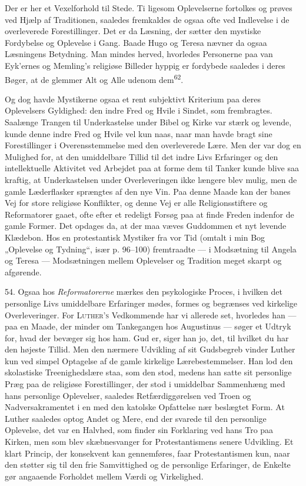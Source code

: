 \documentclass[12pt,a4paper,openany]{book}
\newcommand{\opage}[1]{\marginnote{\footnotesize\textit{[#1]}}}
\begin{document}
Der er her et Vexelforhold til Stede. Ti ligesom Oplevelserne fortolkes
og prøves ved Hjælp af Traditionen, saaledes fremkaldes de ogsaa ofte
ved Indlevelse i de overleverede Forestillinger. Det er da Læsning, der
sætter den mystiske Fordybelse og Oplevelse i Gang. Baade Hugo og Teresa
nævner da ogsaa Læsningens Betydning. Man mindes herved, hvorledes
Personerne paa van Eyk’ernes og Memling’s religiøse Billeder hyppig er
fordybede saaledes i deres Bøger, at de glemmer Alt og Alle udenom
dem\textsuperscript{62}.

Og dog havde Mystikerne ogsaa et rent subjektivt Kriterium paa deres
Oplevelsers Gyldighed: den indre Fred og Hvile i Sindet, som
frembragtes. Saalænge Trangen til Underkastelse under Bibel og Kirke var
stærk og levende, kunde denne indre Fred og Hvile vel kun naas, naar man
havde bragt sine Forestillinger i Overensstemmelse med den overleverede
Lære. Men der var dog en Mulighed for, at den umiddelbare Tillid til det
indre Livs Erfaringer og den intellektuelle Aktivitet ved Arbejdet paa
at forme dem til Tanker kunde blive saa kraftig, at Underkastelsen under
Overleveringen ikke længere blev mulig, men de gamle Læderflasker
sprængtes af den nye Vin. Paa denne Maade kan der banes Vej for store
religiøse Konflikter, og denne Vej er alle Religionsstiftere og
Reformatorer gaaet, ofte efter et redeligt Forsøg paa at finde Freden
indenfor de gamle Former. Det opdages da, at der maa væves Guddommen et
nyt levende Klædebon. Hos en protestantisk Mystiker fra vor Tid (omtalt
i min Bog „Oplevelse og Tydning“, især p. 96--100) fremtraadte --- i
Modsætning til Angela og Teresa --- Modsætningen mellem Oplevelser og
Tradition meget skarpt og afgørende.

54. Ogsaa hos \textit{Reformatorerne} mærkes den psykologiske Proces, i
hvilken det personlige Livs umiddelbare Erfaringer mødes, formes og
begrænses ved kirkelige Overleveringer. For \textsc{Luther’s}
Vedkommende har vi allerede set, hvorledes han --- paa en Maade, der
minder om Tankegangen hos Augustinus --- søger et Udtryk for, hvad der
bevæger sig hos ham. Gud er, siger han jo, det, til hvilket du har den
højeste Tillid. Men den nærmere Udvikling af sit Gudsbegreb vinder
Luther kun ved simpel Optagelse af de gamle kirkelige Lærebestemmelser.
Han lod den skolastiske Treenighedslære staa, som den stod, medens han
satte sit personlige
\opage{120}Præg paa de religiøse Forestillinger, der stod i umiddelbar
Sammenhæng med hans personlige Oplevelser, saaledes Retfærdiggørelsen
ved Troen og Nadversakramentet i en med den katolske Opfattelse nær
beslægtet Form. At Luther saaledes optog Andet og Mere, end der svarede
til den personlige Oplevelse, det var en Halvhed, som finder sin
Forklaring ved hans Tro paa Kirken, men som blev skæbnesvanger for
Protestantismens senere Udvikling. Et klart Princip, der konsekvent kan
gennemføres, faar Protestantismen kun, naar den støtter sig til den frie
Samvittighed og de personlige Erfaringer, de Enkelte gør angaaende
Forholdet mellem Værdi og Virkelighed.
\end{document}
